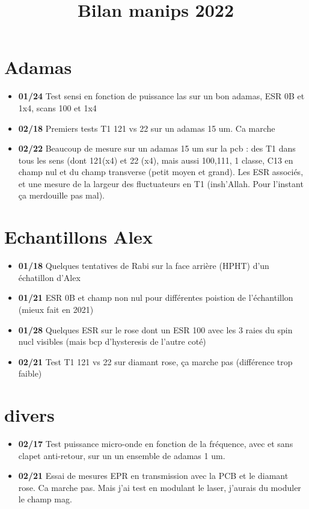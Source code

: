 \documentclass[a4paper]{article}
\title{Bilan manips 2022}
\begin{document}
\maketitle
\section{Adamas}
\begin{itemize}
\item \textbf{01/24} Test sensi en fonction de puissance las sur un bon adamas, ESR 0B et 1x4, scans 100 et 1x4
\item \textbf{02/18} Premiers tests T1 121 vs 22 sur un adamas 15 um. Ca marche
\item \textbf{02/22} Beaucoup de mesure sur un adamas 15 um sur la pcb : des T1 dans tous les sens (dont 121(x4) et 22 (x4), mais aussi 100,111, 1 classe, C13 en champ nul et du champ transverse (petit moyen et grand). Les ESR associés, et une mesure de la largeur des fluctuateurs en T1 (insh'Allah. Pour l'instant ça merdouille pas mal).
\end{itemize}
\section{Echantillons Alex}
\begin{itemize}
\item \textbf{01/18} Quelques tentatives de Rabi sur la face arrière (HPHT) d'un échatillon d'Alex
\item \textbf{01/21} ESR 0B et champ non nul pour différentes poistion de l'échantillon (mieux fait en 2021)
\item \textbf{01/28} Quelques ESR sur le rose dont un ESR 100 avec les 3 raies du spin nucl visibles (mais bcp d'hysteresis de l'autre coté)
\item \textbf{02/21} Test T1 121 vs 22 sur diamant rose, ça marche pas (différence trop faible)
\end{itemize}
\section{divers}
\begin{itemize}
\item \textbf{02/17} Test puissance micro-onde en fonction de la fréquence, avec et sans clapet anti-retour, sur un un ensemble de adamas 1 um.
\item \textbf{02/21} Essai de mesures EPR en transmission avec la PCB et le diamant rose. Ca marche pas. Mais j'ai test en modulant le laser, j'aurais du moduler le champ mag.
\end{itemize}
\end{document}
